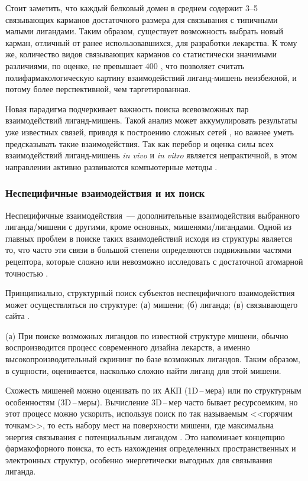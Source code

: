 \documentclass[a4paper,14pt]{article}         %
\begin{document}
Стоит заметить, что каждый белковый домен в среднем содержит 3--5 связывающих карманов достаточного размера для связывания с типичными малыми лигандами\cite{Skolnick2015}. Таким образом, существует возможность выбрать новый карман, отличный от ранее использовавшихся, для разработки лекарства. К тому же, количество видов связывающих карманов со статистически значимыми различиями, по оценке, не превышает 400 \cite{Skolnick2015}, что позволяет считать полифармакологическую картину взаимодействий лиганд-мишень неизбежной, и потому более перспективной, чем таргетированная.

Новая парадигма подчеркивает важность поиска всевозможных пар взаимодействий лиганд-мишень. Такой анализ может аккумулировать результаты уже известных связей, приводя к построению сложных сетей \cite{Anighoro2014}, но важнее уметь предсказывать такие взаимодействия. Так как перебор и оценка силы всех взаимодействий лиганд-мишень \textit{in vivo} и \textit{in vitro} является непрактичной, в этом направлении активно развиваются компьютерные методы \cite{Chaudhari}.

\subsubsection{Неспецифичные взаимодействия и их поиск}
Неспецифичные взаимодействия~--- дополнительные взаимодействия выбранного лиганда/мишени с другими, кроме основных, мишенями/лигандами. Одной из главных проблем в поиске таких взаимодействий исходя из структуры является то, что часто эти связи в большой степени определяются подвижными частями рецептора, которые сложно или невозможно исследовать с достаточной атомарной точностью \cite{Loving}.

Принципиально, структурный поиск субъектов неспецифичного взаимодействия может осуществляться по структуре: (а) мишени; (б) лиганда; (в) связывающего сайта \cite{Rognan2010}.

(а) При поиске возможных лигандов по известной структуре мишени, обычно воспроизводится процесс современного дизайна лекарств, а именно высокопроизводительный скрининг по базе возможных лигандов. Таким образом, в сущности, оценивается, насколько сложно найти лиганд для этой мишени. 

Схожесть мишеней можно оценивать по их АКП (1D\,--\,мера) или по структурным особенностям (3D\,--\,меры). Вычисление 3D\,--\,мер часто бывает ресурсоемким, но этот процесс можно ускорить, используя поиск по так называемым <<горячим точкам>>, то есть набору мест на поверхности мишени, где максимальна энергия связывания с потенциальным лигандом \cite{Hall2015}. Это напоминает концепцию фармакофорного поиска, то есть нахождения определенных пространственных и электронных структур, особенно энергетически выгодных для связывания лиганда.
\end{document}
